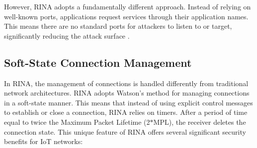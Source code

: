 \documentclass{ieeeaccess}
\begin{document}
However, RINA adopts a fundamentally different approach. Instead of relying on well-known ports, applications request services through their application names. This means there are no standard ports for attackers to listen to or target, significantly reducing the attack surface \cite{small2012}.

\subsection{Soft-State Connection Management}
In RINA, the management of connections is handled differently from traditional network architectures. RINA adopts Watson's method for managing connections in a soft-state manner. This means that instead of using explicit control messages to establish or close a connection, RINA relies on timers. After a period of time equal to twice the Maximum Packet Lifetime (2$*$MPL), the receiver deletes the connection state. This unique feature of RINA offers several significant security benefits for IoT networks:
\end{document}
